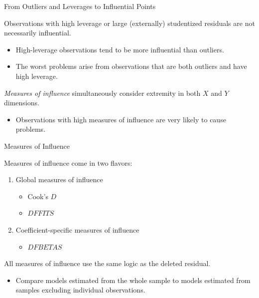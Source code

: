 \documentclass{beamer}\usepackage[]{graphicx}\usepackage[]{color}
\begin{document}
\watermarkon %
    
\begin{frame}{From Outliers and Leverages to Influential Points}
  
  Observations with high leverage or large (externally) studentized residuals
  are not necessarily influential.
  \vc
  \begin{itemize}
  \item High-leverage observations tend to be more influential than outliers.
    \vc
  \item The worst problems arise from observations that are both outliers and
    have high leverage.
  \end{itemize}
  \vb 
  \emph{Measures of influence} simultaneously consider extremity in both $X$
  and $Y$ dimensions.
  \vc
  \begin{itemize}
  \item Observations with high measures of influence are very likely to cause
    problems.
  \end{itemize}
  
\end{frame}


\begin{frame}{Measures of Influence}
  
  Measures of influence come in two flavors:
  \vb
  \begin{enumerate}
  \item Global measures of influence
    \begin{itemize}
    \item Cook's $D$
      \vc
    \item$\textit{DFFITS}$
    \end{itemize}
    \vb
  \item Coefficient-specific measures of influence
    \vb
    \begin{itemize}
    \item $\textit{DFBETAS}$
    \end{itemize}
  \end{enumerate}
  \vb
  All measures of influence use the same logic as the deleted residual.
  \vc
  \begin{itemize}
  \item Compare models estimated from the whole sample to models estimated from 
    samples excluding individual observations.
  \end{itemize}
\end{frame}
\end{document}
